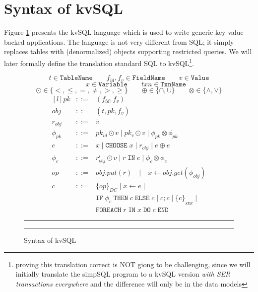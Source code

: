 \documentclass[12pt,letter]{article}
\begin{document}
\section{Syntax of kvSQL}
Figure \ref{fig:syn} presents the kvSQL language which is used to write
generic key-value backed applications. The language is not very
different from SQL; it simply replaces tables with (denormalized)
objects supporting restricted queries. We will later formally define the
translation standard SQL to kvSQL\footnote{proving this translation
correct is NOT giong to be challenging, since we will initially translate the simpSQL
program to a kvSQL version \emph{with SER transactions everywhere} and the difference will
only be in the data models}.


\begin{figure}[h]
	$$
	t \in \texttt{TableName} \qquad 
	f_{id},f_v \in \texttt{FieldName} \qquad 
	v \in \texttt{Value} $$
	\vspace{-7mm} %
	$$\qquad
	x \in \texttt{Variable} \qquad
	txn \in \texttt{TxnName}
	$$
	\vspace{-6mm} %
	$$ \odot \in \{<,\leq,=,\neq,>,\geq\} \qquad 
	\oplus \in \{\cap,\cup\} \qquad 
	\otimes \in \{\wedge, \vee\}
	$$ 
	$$
	\begin{matrix*}[l]
		pk & ::= & (f_{id},f_v)\\
		obj &  ::= & (t,pk,\overline{f_v}) \\
		r_{obj} &  ::= & \bar{v} \\
		\phi_{pk}  & ::= & pk_{id} \odot v \;|\; pk_{v} \odot v
		\;|\; \phi_{pk} \otimes \phi_{pk} \\
		e  & ::= & x \;|\; \texttt{CHOOSE} \; x\;|\; r_{obj} \;|\; e \oplus e\\
		\phi_{c}  & ::= & r^i_{obj}\odot v \;|\;  r\;\texttt{IN} \; e \;|\; \phi_{c} \otimes \phi_{c} \\
		op   & ::= & obj.put(r) \quad
		|\quad x\leftarrow obj.get(\phi_{obj})  \\
		c   & ::=  & \{\overline{op}\}_{DC}
		\;|\; x\leftarrow e \;|\;
		\\  & & \texttt{IF}\; \phi_c \;\texttt{THEN} \;c \;\texttt{ELSE}\; c \;|\;  c;c \;|\;
		\{c\}_{_{SER}} \;|\;
		\\  & & \texttt{FOREACH}\; r \;\texttt{IN} \; x \; \texttt{DO}\; c \;\texttt{END}
		
	\end{matrix*}
	$$
	\hrule \hrule 
\caption{Syntax of kvSQL}
\label{fig:syn}
\end{figure}
\end{document}
